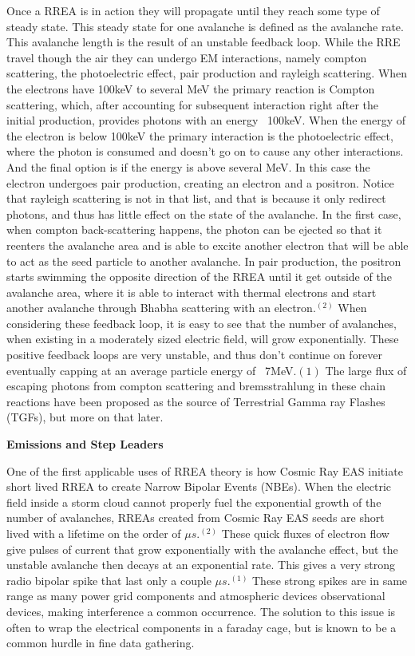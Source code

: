 \documentclass[11pt]{article}
\begin{document}
    Once a RREA is in action they will propagate until they reach some type of steady state. This steady state for one avalanche is defined as the avalanche rate. This avalanche length is the result of an unstable feedback loop. While the RRE travel though the air they can undergo EM interactions, namely compton scattering, the photoelectric effect, pair production and rayleigh scattering. When the electrons have 100keV to several MeV the primary reaction is Compton scattering, which, after accounting for subsequent interaction right after the initial production, provides photons with an energy ~100keV. When the energy of the electron is below 100keV the primary interaction is the photoelectric effect, where the photon is consumed and doesn't go on to cause any other interactions. And the final option is if the energy is above several MeV. In this case the electron undergoes pair production, creating an electron and a positron. Notice that rayleigh scattering is not in that list, and that is because it only redirect photons, and thus has little effect on the state of the avalanche. In the first case, when compton back-scattering happens, the photon can be ejected so that it reenters the avalanche area and is able to excite another electron that will be able to act as the seed particle to another avalanche. In pair production, the positron starts swimming the opposite direction of the RREA until it get outside of the avalanche area, where it is able to interact with thermal electrons and start another avalanche through Bhabha scattering with an electron.$^{(2)}$ When considering these feedback loop, it is easy to see that the number of avalanches, when existing in a moderately sized electric field, will grow exponentially. These positive feedback loops are very unstable, and thus don't continue on forever eventually capping at an average particle energy of ~7MeV.${(1)}$ The large flux of escaping photons from compton scattering and bremsstrahlung in these chain reactions have been proposed as the source of Terrestrial Gamma ray Flashes (TGFs), but more on that later. 
    \newline
    

    \noindent
{\bf \LARGE Emissions and Step Leaders}
    
    One of the first applicable uses of RREA theory is how Cosmic Ray EAS initiate short lived RREA to create Narrow Bipolar Events (NBEs). When the electric field inside a storm cloud cannot properly fuel the exponential growth of the number of avalanches, RREAs created from Cosmic Ray EAS seeds are short lived with a lifetime on the order of $\mu s$.$^{(2)}$ These quick fluxes of electron flow give pulses of current that grow exponentially with the avalanche effect, but the unstable avalanche then decays at an exponential rate. This gives a very strong radio bipolar spike that last only a couple $\mu s$.$^{(1)}$ These strong spikes are in same range as many power grid components and atmospheric devices observational devices, making interference a common occurrence. The solution to this issue is often to wrap the electrical components in a faraday cage, but is known to be a common hurdle in fine data gathering. 
    
\end{document}
